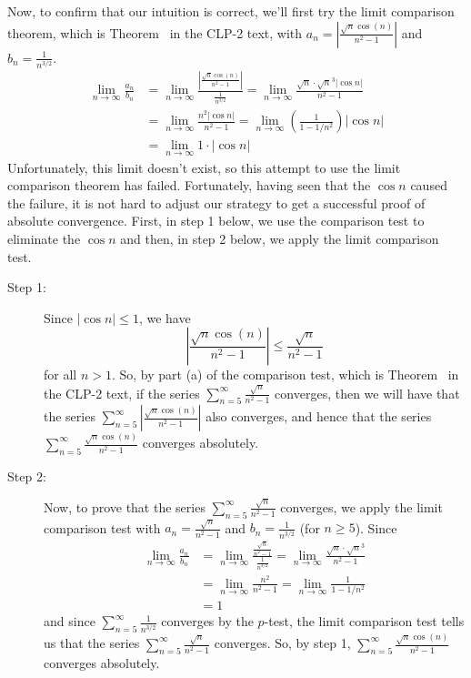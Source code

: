 \begin{solution}
Now, to confirm that our intuition is correct, we'll first try the limit comparison theorem, which is Theorem~ 
in the CLP-2 text, with $a_n=\left| \frac{\sqrt{n}\cos(n)}{n^2-1}\right|$
and $b_n = \frac{1}{n^{3/2}}$.
\begin{align*}
\lim_{n \to \infty}\frac{a_n}{b_n}&=\lim_{n \to \infty} \frac{\left|\frac{\sqrt{n}\cos(n)}{n^2-1}\right| }{\frac{1}{n^{3/2}}} = \lim_{n \to \infty}\frac{\sqrt{n}\cdot\sqrt{n}^3|\cos n|}{n^2-1}\\
&=\lim_{n \to \infty}\frac{n^2|\cos n|}{n^2-1} = \lim_{n \to \infty}\left(\frac{1}{1-1/n^2}\right)|\cos n|\\
& = \lim_{n \to \infty}1\cdot|\cos n|
\end{align*}
Unfortunately, this limit doesn't exist, so this attempt to use the limit comparison theorem has failed. Fortunately, having seen that the $\cos n$ caused the failure, it is not hard to adjust our strategy to get a successful proof of absolute convergence. First, in step 1 below, we use the comparison test to eliminate the $\cos n$ and then, in step 2 below, we apply the limit comparison 
test.
\begin{description}
\item[Step 1:] Since $|\cos n|\le 1$, we have
\begin{equation*}
\left|\frac{\sqrt{n}\cos(n)}{n^2-1}\right|
\le \frac{\sqrt{n}}{n^2-1}
\end{equation*} 
for all $n> 1$. So, by part (a) of the comparison test, which is
Theorem~ in the CLP-2 text, if
the series $\displaystyle \sum_{n=5}^\infty \frac{\sqrt{n}}{n^2-1}$ converges, 
then we will have that the series 
$\displaystyle \sum_{n=5}^\infty \left|\frac{\sqrt{n}\cos(n)}{n^2-1}\right|$ also converges, and hence that the series
$\displaystyle \sum_{n=5}^\infty \frac{\sqrt{n}\cos(n)}{n^2-1}$ converges absolutely.

\item[Step 2:]
Now, to prove that the series 
$\displaystyle \sum_{n=5}^\infty \frac{\sqrt{n}}{n^2-1}$ converges,  
we apply the limit comparison test with $a_n=\frac{\sqrt{n}}{n^2-1}$ 
and $b_n = \frac{1}{n^{3/2}}$ (for $n\ge 5$). Since 
\begin{align*}
\lim_{n \to \infty}\frac{a_n}{b_n}
&=\lim_{n \to \infty} \frac{\frac{\sqrt{n}}{n^2-1}}{\frac{1}{n^{3/2}}} 
= \lim_{n \to \infty}\frac{\sqrt{n}\cdot\sqrt{n}^3}{n^2-1}\\
&=\lim_{n \to \infty}\frac{n^2}{n^2-1} 
= \lim_{n \to \infty}\frac{1}{1-1/n^2}\\
& = 1
\end{align*}
and since $\displaystyle \sum_{n=5}^\infty \frac{1}{n^{3/2}}$ converges by the 
$p$-test, the limit comparison test tells us that the series 
$\displaystyle\sum_{n=5}^\infty \frac{\sqrt{n}}{n^2-1}$ converges. So, 
by step 1, $\displaystyle\sum_{n=5}^\infty \frac{\sqrt{n}\cos(n)}{n^2-1}$ 
converges absolutely.
\end{description}


\end{solution}
